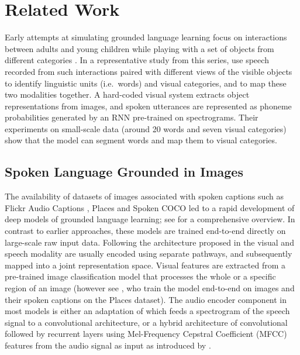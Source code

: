 \section{Related Work}
\label{sec:related}

Early attempts at simulating grounded language learning focus on
interactions between adults and young children while playing with a
set of objects from different categories \cite{roy1999learning,roy2002learning,
  gorniak2003visually,mukherjee2003visual}. In a representative study
from this series, \citet{roypentland2002learning} use speech recorded from
such interactions paired with different views of the visible objects
to identify linguistic units (i.e.\ words) and visual categories, and
to map these two modalities together. A hard-coded visual system
extracts object representations from images, and spoken utterances are
represented as phoneme probabilities generated by an RNN pre-trained on
spectrograms.  Their experiments on small-scale data (around 20 words
and seven visual categories) show that the model can segment words and
map them to visual categories.

\subsection{Spoken Language Grounded in Images}
\label{sec:images}
The availability of datasets of images associated with spoken captions
such as Flickr Audio Captions \cite{harwath2015deep}, Places
\cite{zhou2014learning} and Spoken COCO \cite{hsu2019transfer} led to
a rapid development of deep models of grounded language learning; see
\citet{chrupala-visually-2021} for a comprehensive overview. In contrast to 
earlier approaches, these models are trained end-to-end directly on large-scale 
raw input data.
Following the architecture proposed in \citet{karpathy2014deep} the visual and 
speech modality are usually encoded using separate pathways, and subsequently 
mapped into a joint representation space.
Visual features are extracted from a pre-trained
image classification model that processes the whole or a specific
region of an image (however see \citet{harwath2018jointly}, who train the
model end-to-end on images and their spoken captions on the Places
dataset). The audio encoder component in most models is 
either an adaptation of \citet{harwath2016unsupervised} which feeds a
spectrogram of the speech signal to a convolutional architecture, or a
hybrid architecture of convolutional followed by recurrent layers using
Mel-Frequency Cepstral Coefficient (MFCC) features from the audio
signal as input as introduced by \citet{chrupala-etal-2017-representations}.

